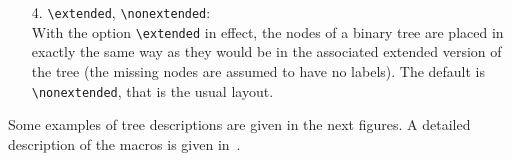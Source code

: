 \begin{enumerate}
\fussy                                                                          
\item[4.] \verb.\extended., \verb.\nonextended.:\\                              
     With the option \verb.\extended. in effect, the nodes of a binary          
     tree are placed in exactly the same way as they would be in the            
     associated extended version of the tree (the missing nodes are             
     assumed to have no labels). The default is \verb.\nonextended.,            
     that is the usual layout.                                                  
\end{enumerate}                                                                 
                                                                                
Some examples of tree descriptions                                              
are given in the next figures.                
A detailed description of the                                                   
\TreeTeX{} macros is given in~\cite{TreeTeX}.
                                   
\Treestyle{\vdist{60pt}}                                                        
\dummyhalfcenterdim@n=10pt                                                      
                                                                                
